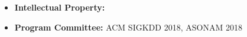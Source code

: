 
\begin{itemize}[nosep]
    \item {\bf Intellectual Property: } 
    \item {\bf Program Committee: } ACM SIGKDD 2018, ASONAM 2018
\end{itemize}
